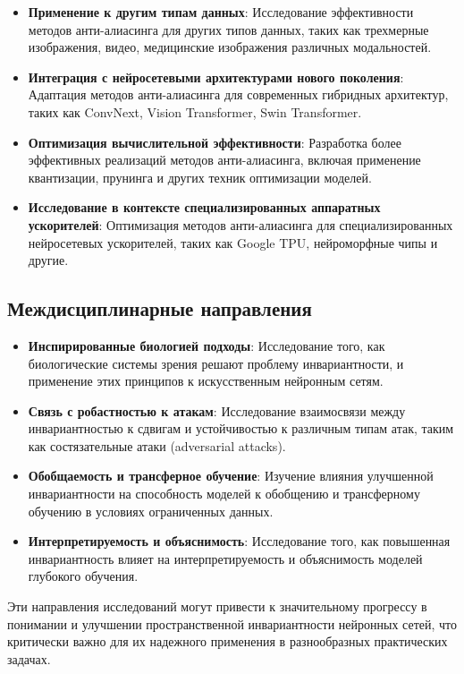 \begin{itemize}
    \item \textbf{Применение к другим типам данных}: Исследование эффективности методов анти-алиасинга для других типов данных, таких как трехмерные изображения, видео, медицинские изображения различных модальностей.
    
    \item \textbf{Интеграция с нейросетевыми архитектурами нового поколения}: Адаптация методов анти-алиасинга для современных гибридных архитектур, таких как ConvNext, Vision Transformer, Swin Transformer.
    
    \item \textbf{Оптимизация вычислительной эффективности}: Разработка более эффективных реализаций методов анти-алиасинга, включая применение квантизации, прунинга и других техник оптимизации моделей.
    
    \item \textbf{Исследование в контексте специализированных аппаратных ускорителей}: Оптимизация методов анти-алиасинга для специализированных нейросетевых ускорителей, таких как Google TPU, нейроморфные чипы и другие.
\end{itemize}

\subsection{Междисциплинарные направления}
\label{discussion:future:interdisciplinary}

\begin{itemize}
    \item \textbf{Инспирированные биологией подходы}: Исследование того, как биологические системы зрения решают проблему инвариантности, и применение этих принципов к искусственным нейронным сетям.
    
    \item \textbf{Связь с робастностью к атакам}: Исследование взаимосвязи между инвариантностью к сдвигам и устойчивостью к различным типам атак, таким как состязательные атаки (adversarial attacks).
    
    \item \textbf{Обобщаемость и трансферное обучение}: Изучение влияния улучшенной инвариантности на способность моделей к обобщению и трансферному обучению в условиях ограниченных данных.
    
    \item \textbf{Интерпретируемость и объяснимость}: Исследование того, как повышенная инвариантность влияет на интерпретируемость и объяснимость моделей глубокого обучения.
\end{itemize}

Эти направления исследований могут привести к значительному прогрессу в понимании и улучшении пространственной инвариантности нейронных сетей, что критически важно для их надежного применения в разнообразных практических задачах. 